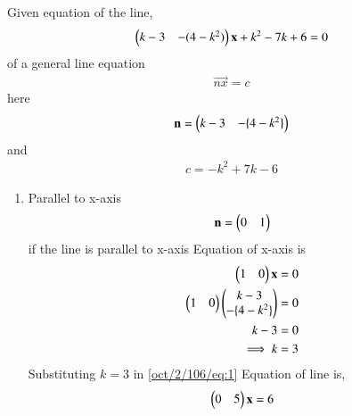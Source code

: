 Given equation of the line, 
\begin{align}
\begin{pmatrix}k-3 & -(4-k^2)\end{pmatrix}\mathbf{x}+k^2-7k+6=0\label{oct/2/106/eq:1}\end{align}
of a general line equation \begin{align}{\vec{nx} = c}\end{align}\newline
here \begin{align}{\vec{n} =\myvec{k-3 & -\{4-k^2\}}}\newline\end{align}
and \begin{align}{c = -k^2+7k-6}\end{align}
\begin{enumerate}[label=\emph{\alph*)}]
\item Parallel to x-axis
\begin{align}
\mathbf{n}=\begin{pmatrix}0 & 1\end{pmatrix}\end{align}if the line is parallel to x-axis
Equation of x-axis is \begin{align}\begin{split}\begin{pmatrix}1 & 0\end{pmatrix}\mathbf{x}& =0\\
 \begin{pmatrix}1 & 0\end{pmatrix}\begin{pmatrix}k-3\\-\{4-k^2\}\end{pmatrix} & = 0 \label{oct/2/106/eq1}\\
  k-3 & = 0\\
    \implies k & =3
\end{split}\end{align}
Substituting $k=3$ in \eqref{oct/2/106/eq:1}
Equation of line is,
\begin{align}
     \begin{pmatrix}0 & 5\end{pmatrix}\mathbf{x}=6
\end{align}
 

\end{enumerate}
